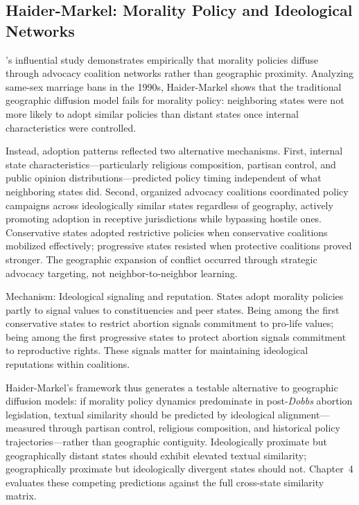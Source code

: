 \subsection{Haider-Markel: Morality Policy and Ideological Networks}

\textcite{haider-markelPolicyDiffusionGeographical2001}'s influential study demonstrates empirically that morality policies diffuse through advocacy coalition networks rather than geographic proximity. Analyzing same-sex marriage bans in the 1990s, Haider-Markel shows that the traditional geographic diffusion model fails for morality policy: neighboring states were not more likely to adopt similar policies than distant states once internal characteristics were controlled.

Instead, adoption patterns reflected two alternative mechanisms. First, internal state characteristics---particularly religious composition, partisan control, and public opinion distributions---predicted policy timing independent of what neighboring states did. Second, organized advocacy coalitions coordinated policy campaigns across ideologically similar states regardless of geography, actively promoting adoption in receptive jurisdictions while bypassing hostile ones. Conservative states adopted restrictive policies when conservative coalitions mobilized effectively; progressive states resisted when protective coalitions proved stronger. The geographic expansion of conflict occurred through strategic advocacy targeting, not neighbor-to-neighbor learning.

Mechanism: Ideological signaling and reputation. States adopt morality policies partly to signal values to constituencies and peer states. Being among the first conservative states to restrict abortion signals commitment to pro-life values; being among the first progressive states to protect abortion signals commitment to reproductive rights. These signals matter for maintaining ideological reputations within coalitions.

Haider-Markel's framework thus generates a testable alternative to geographic diffusion models: if morality policy dynamics predominate in post-\textit{Dobbs} abortion legislation, textual similarity should be predicted by ideological alignment---measured through partisan control, religious composition, and historical policy trajectories---rather than geographic contiguity. Ideologically proximate but geographically distant states should exhibit elevated textual similarity; geographically proximate but ideologically divergent states should not. Chapter~4 evaluates these competing predictions against the full cross-state similarity matrix.

